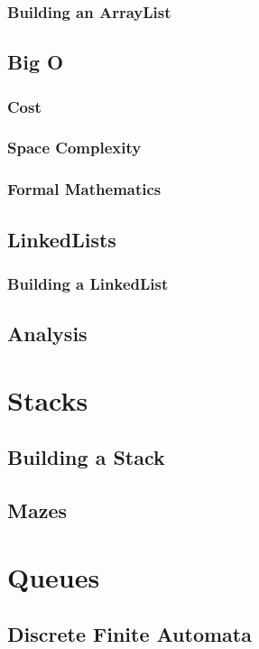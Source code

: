 \documentclass[10pt,a4paper]{book}
\begin{document}
\subsection{Building an ArrayList}
\section{Big O}

\subsection{Cost}

\subsection{Space Complexity}

\subsection{Formal Mathematics}

\section{LinkedLists}
\subsection{Building a LinkedList}

\section{Analysis}
\chapter{Stacks}

\section{Building a Stack}

\section{Mazes}

\chapter{Queues}


\section{Discrete Finite Automata}
\end{document}
